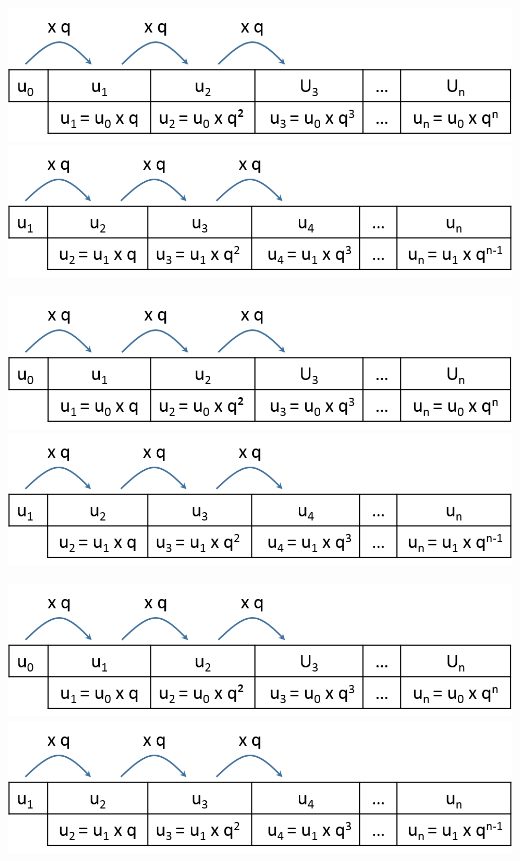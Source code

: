 \documentclass[12pt,a4paper]{article}
\begin{document}
\begin{multicols}{2}
	\includegraphics[scale=0.45]{./img/geo1}
	\includegraphics[scale=0.45]{./img/geo2}
\end{multicols}




\begin{multicols}{2}
	\includegraphics[scale=0.45]{./img/geo1}
	\includegraphics[scale=0.45]{./img/geo2}
\end{multicols}


\begin{multicols}{2}
	\includegraphics[scale=0.45]{./img/geo1}
	\includegraphics[scale=0.45]{./img/geo2}
\end{multicols}
\end{document}
